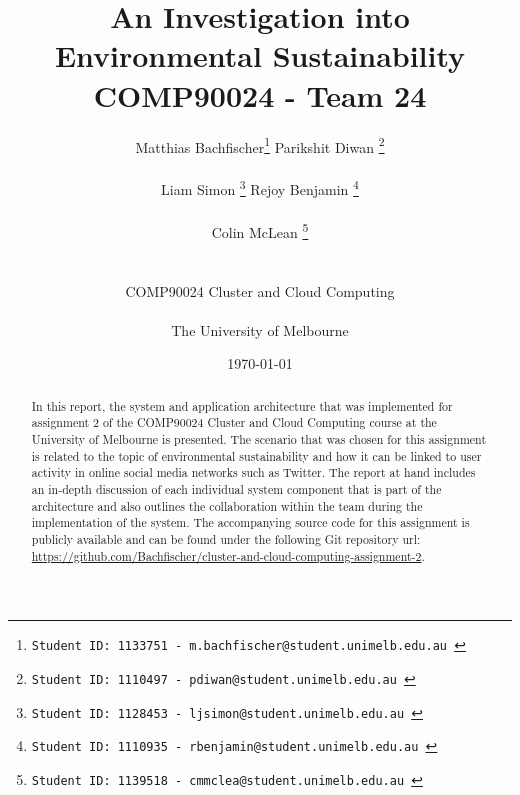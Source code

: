 \documentclass[11pt, oneside]{article}
\title{An Investigation into Environmental Sustainability COMP90024 - Team 24}
\author{Matthias Bachfischer\thanks{\tt \space Student ID: 1133751 - m.bachfischer@student.unimelb.edu.au } \qquad Parikshit Diwan \thanks{\tt  \space Student ID: 1110497 - pdiwan@student.unimelb.edu.au } \\ \\
\qquad Liam Simon \thanks{\tt  \space Student ID: 1128453 - ljsimon@student.unimelb.edu.au } \qquad Rejoy Benjamin \thanks{\tt  \space Student ID: 1110935 - rbenjamin@student.unimelb.edu.au } \\ \\
\qquad Colin McLean \thanks{\tt  \space Student ID: 1139518 - cmmclea@student.unimelb.edu.au }
\\ \\ \\
   COMP90024 Cluster and Cloud Computing \\ \\
     The University of Melbourne \\
}
\date{\today}
\begin{document}
\maketitle

\begin{abstract}
In this report, the system and application architecture that was implemented for assignment 2 of the COMP90024 Cluster and Cloud Computing course at the University of Melbourne is presented. The scenario that was chosen for this assignment is related to the topic of environmental sustainability and how it can be linked to user activity in online social media networks such as Twitter. 
\newline
The report at hand includes an in-depth discussion of each individual system component that is part of the architecture and also outlines the collaboration within the team during the implementation of the system.
\newline 
The accompanying source code for this assignment is publicly available and can be found under the following Git repository \acrshort{url}:
\newline
\url{https://github.com/Bachfischer/cluster-and-cloud-computing-assignment-2}.
\end{abstract}

\newpage

\tableofcontents

\newpage
\end{document}
